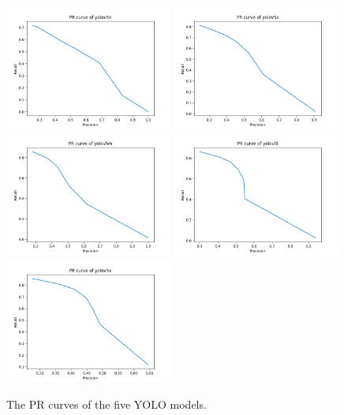 \begin{figure}[h]
    \captionsetup{width=\textwidth}
    \includegraphics[width=0.49\textwidth]{figures/yolov5n.png}
    \includegraphics[width=0.49\textwidth]{figures/yolov5s.png} \\
    \includegraphics[width=0.49\textwidth]{figures/yolov5m.png}
    \includegraphics[width=0.49\textwidth]{figures/yolov5l.png} \\
    \includegraphics[width=0.49\textwidth]{figures/yolov5x.png}
    \caption{The PR curves of the five YOLO models.}
    \label{fig:pr_yolo}
\end{figure}


